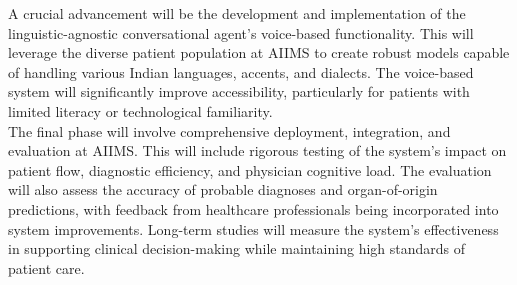 \noindent A crucial advancement will be the development and implementation of the linguistic-agnostic conversational agent's voice-based functionality. This will leverage the diverse patient population at AIIMS to create robust models capable of handling various Indian languages, accents, and dialects. The voice-based system will significantly improve accessibility, particularly for patients with limited literacy or technological familiarity.\\[\baselineskip]

\noindent The final phase will involve comprehensive deployment, integration, and evaluation at AIIMS. This will include rigorous testing of the system's impact on patient flow, diagnostic efficiency, and physician cognitive load. The evaluation will also assess the accuracy of probable diagnoses and organ-of-origin predictions, with feedback from healthcare professionals being incorporated into system improvements. Long-term studies will measure the system's effectiveness in supporting clinical decision-making while maintaining high standards of patient care.

